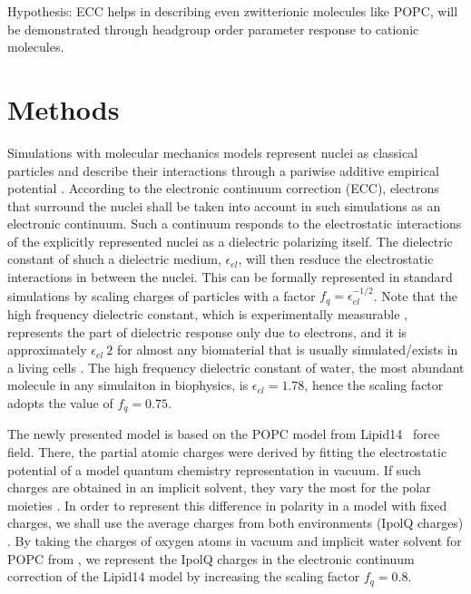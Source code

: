 \documentclass[aip,jcp,twocolumn]{revtex4}
\begin{document}
Hypothesis: ECC helps in describing even zwitterionic molecules like POPC, will be demonstrated through headgroup order parameter response to cationic molecules.

\section{Methods}

Simulations with molecular mechanics models represent nuclei as classical particles 
and describe their interactions through a pariwise additive empirical potential \cite{SOME_review, FF_papers}. 
According to the electronic continuum correction (ECC), electrons that surround 
the nuclei shall be taken into account in such simulations as an electronic continuum. \cite{leontyev11}
Such a continuum responds to the electrostatic interactions of the explicitly represented nuclei
as a dielectric polarizing itself. 
The dielectric constant of shuch a dielectric medium, $\epsilon _{el}$, will 
then resduce the electrostatic interactions in between the nuclei. 
This can be formally represented in standard simulations by scaling charges of particles with a factor $f_q = \epsilon _{el} ^{-1/2}$. 
Note that the high frequency dielectric constant, which is experimentally measurable \cite{some_original_work, leontyev11}, represents
the part of dielectric response only due to electrons, and it is approximately $\epsilon _{el} ~ 2$ for almost any biomaterial that is
usually simulated/exists in a living cells .
The high frequency dielectric constant of water, 
the most abundant molecule in any simulaiton in biophysics, 
is $\epsilon _{el} = 1.78$, hence the scaling factor adopts the value of $f_q = 0.75$. \cite{some_orig_source, leontyev11}

The newly presented model is based on the POPC model from Lipid14~\cite{dickson14} force field. 
There, the partial atomic charges were derived by 
fitting the electrostatic potential of a model quantum chemistry representation in vacuum. 
If such charges are obtained in an implicit solvent, they vary the most for the polar moieties \cite{maiejewski14}. 
In order to represent this difference in polarity in a model with fixed charges, 
we shall use the average charges from both environments (IpolQ charges) \cite{Cerutti2013}. 
By taking the charges of oxygen atoms in vacuum and implicit water solvent for POPC from \cite{maciejewski14}, 
we represent the IpolQ charges in the electronic continuum correction of the Lipid14 model
by increasing the scaling factor $f_q = 0.8$. 
\end{document}
